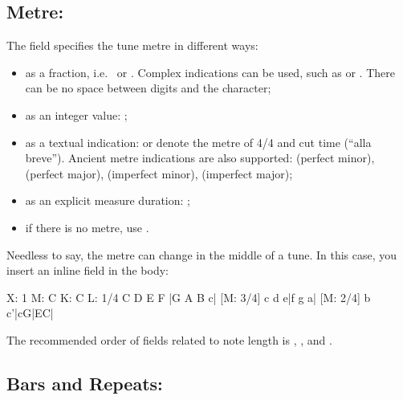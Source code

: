 \documentclass[a4paper,12pt]{book}
\begin{document}

\subsection{Metre: }
\label{sec:metre}

The  field specifies the tune metre in different ways:

\begin{itemize}
  
  \item as a fraction, i.e.\  or . Complex
  indications can be used, such as  or
  . There can be no space between digits and
  the \car{+} character;
  
  \item as an integer value: ;
  
  \item as a textual indication:  or  denote the
  metre of 4/4 and cut time (``alla breve''). Ancient metre
  indications are also supported:  (perfect minor),
   (perfect major),  (imperfect minor),
   (imperfect major);

  \item as an explicit measure duration: ;

  \item if there is no metre, use .
  
\end{itemize}

Needless to say, the metre can change in the middle of a tune. In this
case, you insert an inline  field in the body:

\begin{abcsource}
X: 1
M: C
K: C
L: 1/4
C D E F |G A B c| [M: 3/4] c d e|f g a| [M: 2/4] b c'|cG|EC|
\end{abcsource}


The recommended order of fields related to note length is ,
, and . %


\subsection{Bars and Repeats: \icmd{\textbar{} / : [ ]}}
\end{document}
